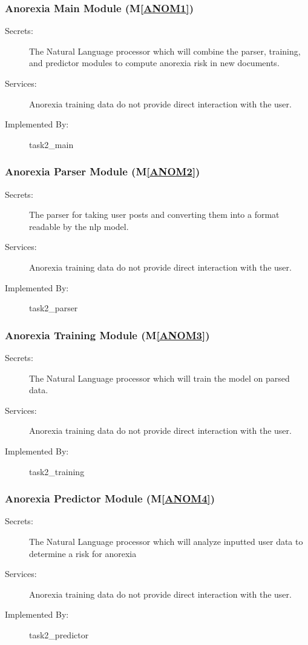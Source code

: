 \documentclass[12pt, titlepage]{article}
\newcommand{\mref}[1]{M\ref{#1}}
\begin{document}
\subsubsection{Anorexia Main Module (\mref{ANOM1})}
\begin{description}
\item[Secrets:] The Natural Language processor which will combine the parser, training, and predictor modules to compute anorexia risk in new documents.
\item[Services:] Anorexia training data
  do not provide direct interaction with the user. 
\item[Implemented By:] task2\_main
\end{description}

\subsubsection{Anorexia Parser Module (\mref{ANOM2})}
\begin{description}
\item[Secrets:] The parser for taking user posts and converting them into a format readable by the nlp model.
\item[Services:] Anorexia training data
  do not provide direct interaction with the user. 
\item[Implemented By:] task2\_parser
\end{description}

\subsubsection{Anorexia Training Module (\mref{ANOM3})}
\begin{description}
\item[Secrets:] The Natural Language processor which will train the model on parsed data.
\item[Services:] Anorexia training data
  do not provide direct interaction with the user. 
\item[Implemented By:] task2\_training
\end{description}

\subsubsection{Anorexia Predictor Module (\mref{ANOM4})}
\begin{description}
\item[Secrets:] The Natural Language processor which will analyze inputted user data to determine a risk for anorexia
\item[Services:] Anorexia training data
  do not provide direct interaction with the user. 
\item[Implemented By:] task2\_predictor
\end{description}
\end{document}
